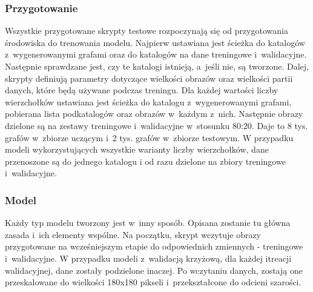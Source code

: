 \subsubsection{Przygotowanie}
Wszystkie przygotowane skrypty testowe rozpoczynają się od przygotowania środowiska do trenowania modelu.
Najpierw ustawiana jest ścieżka do katalogów z~wygenerowanymi grafami oraz do katalogów na dane treningowe i~walidacyjne.
Następnie sprawdzane jest, czy te katalogi istnieją, a~jeśli nie, są tworzone.
Dalej, skrypty definiują parametry dotyczące wielkości obrazów oraz wielkości partii danych, które będą używane podczas treningu.
Dla każdej wartości liczby wierzchołków ustawiana jest ścieżka do katalogu z~wygenerowanymi grafami,
pobierana lista podkatalogów oraz obrazów w~każdym z~nich.
Następnie obrazy dzielone są na zestawy treningowe i~walidacyjne w~stosunku 80:20.
Daje to 8 tys. grafów w~zbiorze uczącym i~2 tys. grafów w~zbiorze testowym.
W przypadku modeli wykorzystujących wszystkie warianty liczby wierzchołków, dane przenoszone są do jednego katalogu
i od razu dzielone na zbiory treningowe i~walidacyjne.

\subsubsection{Model}
Każdy typ modelu tworzony jest w~inny sposób. Opisana zostanie tu główna zasada i~ich elementy wspólne.
Na początku, skrypt wczytuje obrazy przygotowane na wcześniejszym etapie do odpowiednich zmiennych - treningowe i~walidacyjne.
W przypadku modeli z~walidacją krzyżową, dla każdej itreacji walidacyjnej, dane zostały podzielone inaczej.
Po wczytaniu danych, zostają one przeskalowane do wielkości 180x180 pikseli i~przekształcone do odcieni szarości.

\clearpage

